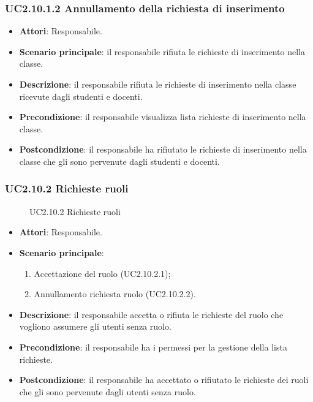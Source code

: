 \subsubsection{UC2.10.1.2 Annullamento della richiesta di inserimento}
\begin{itemize}
\item \textbf{Attori}: Responsabile.
\item \textbf{Scenario principale}: il responsabile rifiuta le richieste di inserimento nella classe.
\item \textbf{Descrizione}: il responsabile rifiuta le richieste di inserimento nella classe ricevute dagli studenti e docenti.
\item \textbf{Precondizione}: il responsabile visualizza lista richieste di inserimento nella classe.
\item \textbf{Postcondizione}: il responsabile ha rifiutato le richieste di inserimento nella classe che gli sono pervenute dagli studenti e docenti.
\end{itemize}
\subsubsection{UC2.10.2 Richieste ruoli}
\begin{figure}[H]
\centering
\noindent{}
\caption{UC2.10.2 Richieste ruoli}
\end{figure}
\begin{itemize}
\item \textbf{Attori}: Responsabile.
\item \textbf{Scenario principale}:
\begin{enumerate}
\item Accettazione del ruolo (UC2.10.2.1);
\item Annullamento richiesta ruolo (UC2.10.2.2).
\end{enumerate}
\item \textbf{Descrizione}: il responsabile accetta o rifiuta le richieste  del ruolo che vogliono assumere gli utenti senza ruolo.
\item \textbf{Precondizione}: il responsabile ha i permessi per la gestione della lista richieste.
\item \textbf{Postcondizione}: il responsabile ha accettato o rifiutato le richieste dei ruoli che gli sono pervenute dagli utenti senza ruolo.
\end{itemize}
